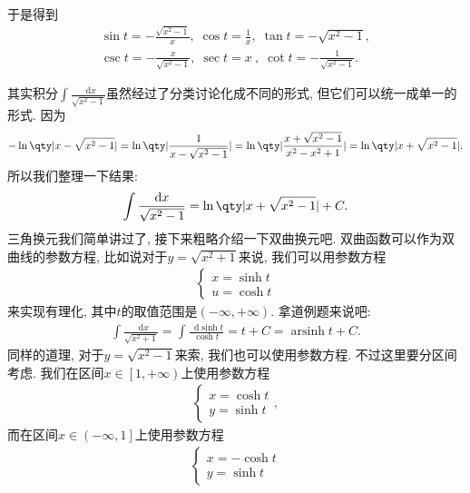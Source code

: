 \documentclass{ctexbook}
\DeclareMathOperator{\arsinh}{arsinh}
\newcommand*{\dif}{\mathop{}\!\mathrm{d}}
\begin{document}
{\begin{center}
\end{center}
于是得到
\begin{align*}
\sin{t}=-\frac{\sqrt{x^{2}-1}}{x},\;\cos{t}=\frac{1}{x},\;\tan{t}=-\sqrt{x^{2}-1},\\
\csc{t}=-\frac{x}{\sqrt{x^{2}-1}},\;\sec{t}=x\:,\;\cot{t}=-\frac{1}{\sqrt{x^{2}-1}}
.\end{align*}\par
其实积分$\int\frac{\dif{x}}{\sqrt{x^{2}-1}}$虽然经过了分类讨论化成不同的形式, 但它们可以统一成单一的形式. 因为
\begin{align*}
-\ln\qty|x-\sqrt{x^{2}-1}|=\ln\qty|\frac{1}{x-\sqrt{x^{2}-1}}|=\ln\qty|\frac{x+\sqrt{x^{2}-1}}{x^{2}-x^{2}+1}|=\ln\qty|x+\sqrt{x^{2}-1}|
.\end{align*}
所以我们整理一下结果: 
\begin{align*}
\int\frac{\dif{x}}{\sqrt{x^{2}-1}}=\ln\qty|x+\sqrt{x^{2}-1}|+C
.\end{align*}
三角换元我们简单讲过了, 接下来粗略介绍一下双曲换元吧. 双曲函数可以作为双曲线的参数方程, 比如说对于$y=\sqrt{x^{2}+1}$来说, 我们可以用参数方程
\begin{align*}
\begin{cases}
x=\sinh{t}\\
u=\cosh{t}
\end{cases}
\end{align*}
来实现有理化, 其中$t$的取值范围是$\left(-\infty,+\infty\right)$. 拿道例题来说吧: 
\begin{align*}
\int\frac{\dif{x}}{\sqrt{x^{2}+1}}=\int\frac{\dif{\sinh{t}}}{\cosh{t}}=t+C=\arsinh{t}+C
.\end{align*}
同样的道理, 对于$y=\sqrt{x^{2}-1}$来索, 我们也可以使用参数方程. 不过这里要分区间考虑. 我们在区间$x\in\left[1,+\infty\right)$上使用参数方程
\begin{align*}
\begin{cases}
x=\cosh{t}\\
y=\sinh{t}
\end{cases}
,\end{align*}
而在区间$x\in\left(-\infty,1\right]$上使用参数方程
\begin{align*}
\begin{cases}
x=-\cosh{t}\\
y=\sinh{t}
\end{cases}

\end{align*}}
\end{document}
